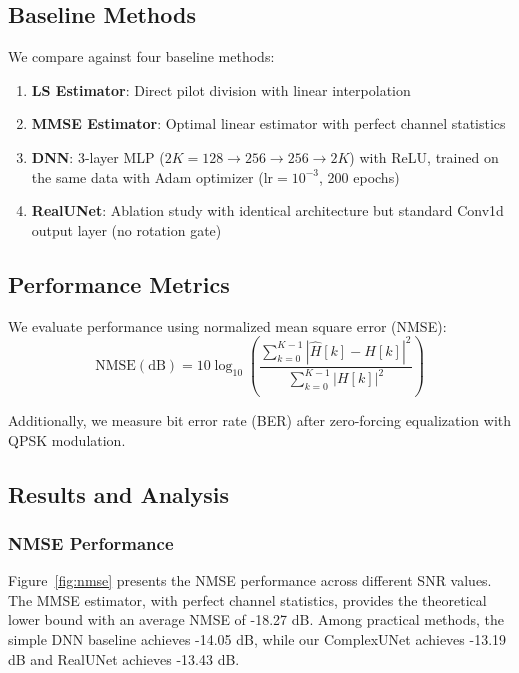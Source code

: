 \documentclass[conference]{IEEEtran}
\begin{document}
\subsection{Baseline Methods}

We compare against four baseline methods:
\begin{enumerate}
\item \textbf{LS Estimator}: Direct pilot division with linear interpolation
\item \textbf{MMSE Estimator}: Optimal linear estimator with perfect channel statistics
\item \textbf{DNN}: 3-layer MLP ($2K{=}128 \to 256 \to 256 \to 2K$) with ReLU, trained on the same data with Adam optimizer ($\text{lr}=10^{-3}$, 200 epochs)
\item \textbf{RealUNet}: Ablation study with identical architecture but standard Conv1d output layer (no rotation gate)
\end{enumerate}

\subsection{Performance Metrics}

We evaluate performance using normalized mean square error (NMSE):
\begin{equation}
\text{NMSE}(\text{dB}) = 10 \log_{10} \left( \frac{\sum_{k=0}^{K-1} |\hat{H}[k] - H[k]|^2}{\sum_{k=0}^{K-1} |H[k]|^2} \right)
\end{equation}

Additionally, we measure bit error rate (BER) after zero-forcing equalization with QPSK modulation.

\subsection{Results and Analysis}

\subsubsection{NMSE Performance}

Figure~\ref{fig:nmse} presents the NMSE performance across different SNR values. The MMSE estimator, with perfect channel statistics, provides the theoretical lower bound with an average NMSE of -18.27 dB. Among practical methods, the simple DNN baseline achieves -14.05 dB, while our ComplexUNet achieves -13.19 dB and RealUNet achieves -13.43 dB.
\end{document}
